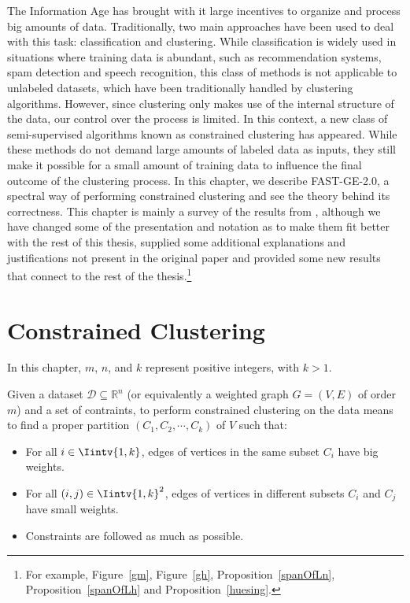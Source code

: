 The Information Age has brought with it large incentives to organize and process big amounts of data.
Traditionally, two main approaches have been used to deal with this task: classification and clustering.
While classification is widely used in situations where training data is abundant, such as recommendation systems, spam detection and speech recognition, this class of methods is not applicable to unlabeled datasets, which have been traditionally handled by clustering algorithms.
However, since clustering only makes use of the internal structure of the data, our control over the process is limited.
In this context, a new class of semi-supervised algorithms known as constrained clustering has appeared.
While these methods do not demand large amounts of labeled data as inputs, they still make it possible for a small amount of training data to influence the final outcome of the clustering process.
In this chapter, we describe FAST-GE-2.0, a spectral way of performing constrained clustering and see the theory behind its correctness.
This chapter is mainly a survey of the results from \cite{fastge2}, although we have changed some of the presentation and notation as to make them fit better with the rest of this thesis, supplied some additional explanations and justifications not present in the original paper and provided some new results that connect to the rest of the thesis.\footnote{For example, Figure~\vref{gm}, Figure~\vref{gh}, Proposition~\vref{spanOfLn}, Proposition~\vref{spanOfLh} and Proposition~\vref{huesing}.}

\section{Constrained Clustering}
In this chapter, $m$, $n$, and $k$ represent positive integers, with $k > 1$.

Given a dataset $\mathcal D \subseteq \mathbb{R}^{n }$ (or equivalently a weighted graph $G = (V,E)$ of order $m$) and a set of contraints, to perform constrained clustering on the data means to find a proper partition $(C_1, C_2, \cdots, C_k)$ of $V$ such that:
\begin{itemize}
   \item For all $i \in \Iintv{1,k}$, edges of vertices in the same subset $C_i$ have big weights.
   \item For all $(i,j) \in \Iintv{1,k}^2$, edges of vertices in different subsets $C_i$ and $C_j$ have small weights.
   \item Constraints are followed as much as possible.
\end{itemize}

